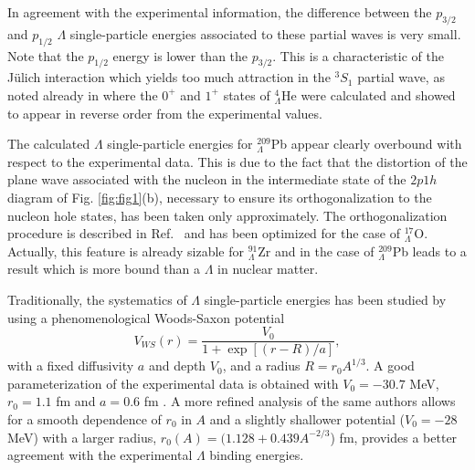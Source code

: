 In agreement with the experimental information, the difference between
the $p_{3/2}$ and $p_{1/2}$ $\Lambda$ single-particle
energies associated to these partial waves is very
small. Note that the $p_{1/2}$ energy is lower than the $p_{3/2}$. This is
a characteristic of the J\"ulich interaction which yields too much
attraction in the $^{3}S_{1}$ partial wave, 
as noted already in \cite{yama92,yama94} where the
$0^{+}$ and $1^{+}$ states of $_{\Lambda}^{4}$He were calculated and
showed to appear in reverse order from the experimental values.

The calculated $\Lambda$ single-particle energies for 
$_{\Lambda}^{209}$Pb appear clearly overbound with respect to the experimental data. 
This is due to the fact that the distortion of
the plane wave associated with the nucleon in the intermediate state of
the $2p1h$ diagram of Fig. \ref{fig:fig1}(b), necessary to ensure its
orthogonalization
to the nucleon hole states, has been taken only approximately. 
The orthogonalization procedure is described in Ref.\ \cite{bbmp92} and
has been optimized for 
the case of $_{\Lambda}^{17}$O. Actually, this
feature is already sizable for $_{\Lambda}^{91}$Zr and in the case of
 $_{\Lambda}^{209}$Pb
leads to a result which is more bound than a $\Lambda$ in nuclear matter.


Traditionally, the systematics of $\Lambda$ single-particle
energies
has been studied by using a phenomenological Woods-Saxon potential
\begin{equation}
      V_{WS}(r)=\frac{V_0}{1+\exp{[(r-R)/a]}},
      \label{eq:ws}
\end{equation}
with a fixed diffusivity $a$ and depth $V_0$,  and a radius $R=r_0
A^{1/3}$.
A good parameterization of the experimental data is obtained with
$V_0=-30.7$ MeV, $r_0=1.1$ fm and $a=0.6$ fm \cite{mille88}. 
 A more refined analysis of the same authors allows for a
smooth dependence of $r_0$ in $A$ and a slightly shallower
potential ($V_0=-28$ MeV) with a larger radius, $r_0(A)=(1.128 +
0.439 A^{-2/3}$) fm, provides a better agreement with the experimental $\Lambda$
binding energies. 

